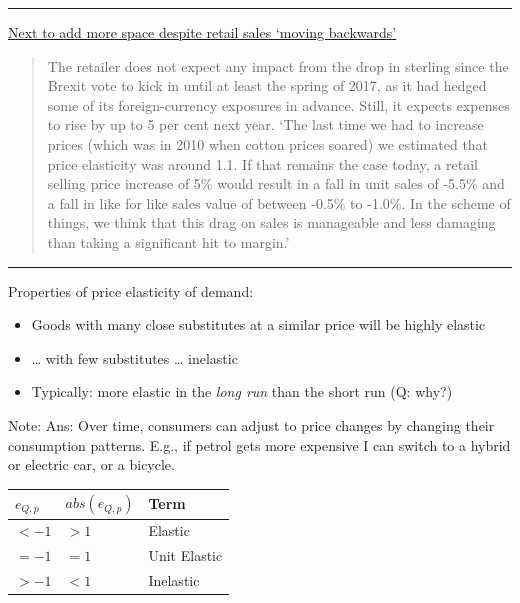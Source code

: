 \documentclass[]{article}
\providecommand{\tightlist}{%
  \setlength{\itemsep}{0pt}\setlength{\parskip}{0pt}}
\begin{document}
\begin{center}\rule{0.5\linewidth}{\linethickness}\end{center}

\href{https://www.ft.com/content/932927d8-266c-3559-b87a-8d3efb07d5e1}{Next to add more space despite retail sales `moving backwards'}

\begin{quote}
The retailer does not expect any impact from the drop in sterling since the Brexit vote to kick in until at least the spring of 2017, as it had hedged some of its foreign-currency exposures in advance. Still, it expects expenses to rise by up to 5 per cent next year.
`The last time we had to increase prices (which was in 2010 when cotton prices soared) we estimated that price elasticity was around 1.1. If that remains the case today, a retail selling price increase of 5\% would result in a fall in unit sales of -5.5\% and a fall in like for like sales value of between -0.5\% to -1.0\%. In the scheme of things, we think that this drag on sales is manageable and less damaging than taking a significant hit to margin.'
\end{quote}

\begin{center}\rule{0.5\linewidth}{\linethickness}\end{center}

Properties of price elasticity of demand:

\begin{itemize}
\tightlist
\item
  Goods with many close substitutes at a similar price will be highly elastic
\item
  \ldots{} with few substitutes \ldots{} inelastic
\item
  Typically: more elastic in the \emph{long run} than the short run (Q: why?)
\end{itemize}

Note: Ans: Over time, consumers can adjust to price changes by changing their consumption patterns. E.g., if petrol gets more expensive I can switch to a hybrid or electric car, or a bicycle.

\bigskip

\begin{longtable}[]{@{}lll@{}}
\toprule
\(e_{Q,p}\) & \(abs(e_{Q,p})\) & Term\tabularnewline
\midrule
\endhead
\(< -1\) & \(>1\) & Elastic\tabularnewline
\(= -1\) & \(=1\) & Unit Elastic\tabularnewline
\(> -1\) & \(<1\) & Inelastic\tabularnewline
\bottomrule
\end{longtable}
\end{document}
